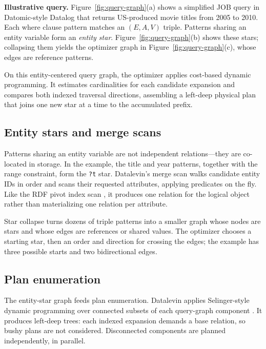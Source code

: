 \documentclass[sigconf]{cidr-2027}
\begin{document}
\noindent\textbf{Illustrative query.}
Figure~\ref{fig:query-graph}(a) shows a simplified JOB query in Datomic-style
Datalog \cite{datomicQueryStats} that returns US-produced movie titles from
2005 to 2010. Each where clause pattern matches an $(E,A,V)$ triple.
Patterns sharing an entity variable form an \emph{entity star}.
Figure~\ref{fig:query-graph}(b) shows these stars; collapsing them yields the
optimizer graph in Figure~\ref{fig:query-graph}(c), whose edges are reference
patterns.

On this entity-centered query graph, the optimizer applies cost-based dynamic
programming. It estimates cardinalities for each candidate expansion and
compares both indexed traversal directions, assembling a left-deep physical
plan that joins one new star at a time to the accumulated prefix.

\subsection{Entity stars and merge scans}

Patterns sharing an entity variable are not independent relations---they are
co-located in storage. In the example, the title and year patterns, together
with the range constraint, form the \texttt{?t} star. Datalevin's merge scan
walks candidate entity IDs in order and scans their requested attributes,
applying predicates on the fly. Like the RDF pivot index scan
\cite{brodt2011resource}, it produces one relation for the logical object
rather than materializing one relation per attribute.

Star collapse turns dozens of triple patterns into a smaller graph whose
nodes are stars and whose edges are references or shared values. The optimizer
chooses a starting star, then an order and direction for crossing the edges;
the example has three possible starts and two bidirectional edges.

\subsection{Plan enumeration}

The entity-star graph feeds plan enumeration. Datalevin applies
Selinger-style dynamic programming over connected subsets of each query-graph
component \cite{selinger1979access,moerkotte2008dynamic}.
It produces left-deep trees: each indexed expansion demands a base relation,
so bushy plans are not considered. Disconnected components are planned
independently, in parallel.
\end{document}
